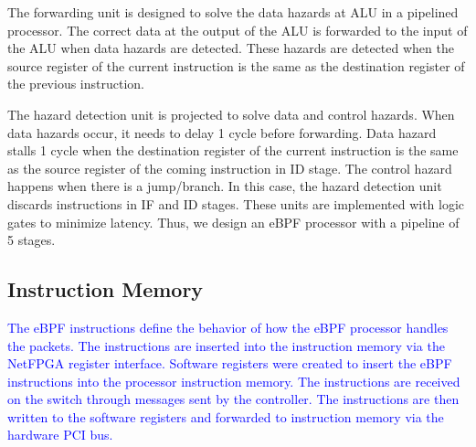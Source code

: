 The forwarding unit is designed to solve the data hazards at ALU in a pipelined processor. The correct data at the output of the ALU is forwarded to the input of the ALU when data hazards are detected. These hazards are detected when the source register of the current instruction is the same as the destination register of the previous instruction.

The hazard detection unit is projected to solve data and control hazards. When data hazards occur, it needs to delay 1 cycle before forwarding.
Data hazard stalls 1 cycle when the destination register of the current instruction is the same as the source register of the coming instruction in ID stage. The control hazard happens when there is a jump/branch. In this case, the hazard detection unit discards instructions in IF and ID stages.
These units are implemented with logic gates to minimize latency.
Thus, we design an eBPF processor with a pipeline of 5 stages.


\subsection{Instruction Memory} 



\textcolor{blue}{The eBPF instructions define the behavior of how the eBPF processor handles the packets. The instructions are inserted into the instruction memory via the NetFPGA register interface. Software registers were created to insert the eBPF instructions into the processor instruction memory. The instructions are received on the switch through messages sent by the controller. The instructions are then written to the software registers and forwarded to instruction memory via the hardware PCI bus.} 

